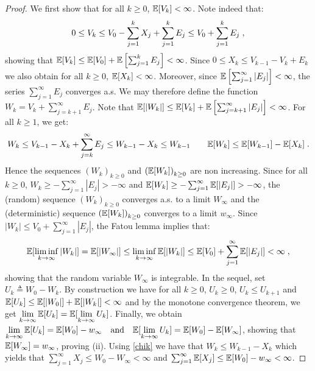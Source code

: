 \documentclass[final,12pt]{alt2022} %
\begin{document}
\begin{proof}
  We first show that for all $k \geq 0$, $\EE[V_k] < \infty$. Note indeed that:
\begin{equation}\notag
0 \leq V_k \leq V_0 - \sum_{j=1}^{k}{X_j} + \sum_{j=1}^{k}{E_j}\leq V_0 + \sum_{j=1}^{k}{E_j} \eqsp,
\end{equation}
showing that $\EE[V_k] \leq \EE[V_0] + \EE\left[\sum_{j=1}^{k}{E_j}\right] < \infty$.
Since $0 \leq X_k \leq V_{k-1} - V_k + E_k$ we also obtain for all $k \geq 0$, $\EE[X_k] < \infty$. Moreover, since $\EE\left[\sum_{j=1}^{\infty}{|E_j|}\right] < \infty$, the series $\sum_{j=1}^{\infty}{E_j}$ converges a.s. We may therefore define the function $W_k = V_k + \sum_{j=k+1}^{\infty}{E_j}$.
Note that $\EE[|W_k|] \leq \EE[V_k]+\EE\left[\sum_{j=k+1}^{\infty}{|E_j|}\right] < \infty $. For all $k \geq 1$, we get:
\begin{equation}\label{chik}
\begin{split}
 W_{k} \leq V_{k-1} - X_{k} + \sum_{j=k}^{\infty}{E_j} \leq W_{k-1} - X_{k}\leq W_{k-1} \qquad \EE[W_k] \leq \EE[W_{k-1}] - \EE[X_{k}] \eqsp.
\end{split}
\end{equation}
Hence the sequences $(W_k)_{k\geq0}$ and $\left(\EE[W_k] \right)_{k\geq0}$ are non increasing. Since for all $k \geq 0$, $W_k \geq -  \sum_{j=1}^{\infty}{|E_j|} > -\infty$ and $\EE[W_k] \geq -  \sum_{j=1}^{\infty}{\EE[|E_j|]} > -\infty$, the (random) sequence $(W_k)_{k\geq0}$ converges a.s. to a limit $W_{\infty}$ and the (deterministic) sequence $\left(\EE[W_k] \right)_{k\geq0}$ converges to a limit $w_{\infty}$. Since $|W_k| \leq V_0 +  \sum_{j=1}^{\infty}{|E_j|}$, the Fatou lemma implies that:
\begin{equation}\notag
\EE[\liminf \limits_{k \to \infty} |W_k|] = \EE[|W_{\infty}|] \leq \liminf \limits_{k \to \infty} \EE[|W_{k}|] \leq \EE[V_{0}] + \sum_{j=1}^{\infty}{\EE[|E_j|]}< \infty \eqsp,
\end{equation}
showing that the random variable $W_{\infty}$  is integrable.
In the sequel, set $U_k \triangleq W_0 - W_k$. By construction we have for all $k \geq 0$, $U_k \geq 0$, $U_k \leq U_{k+1}$ and $\EE[U_k] \leq \EE[|W_0|] + \EE[|W_k|] < \infty$ and by the monotone convergence theorem, we get $\lim \limits_{k \to \infty} \EE[U_k] = \EE[\lim \limits_{k \to \infty}U_k]$.
Finally, we obtain $\lim \limits_{k \to \infty} \EE[U_k] = \EE[W_0] - w_{\infty} \quad \textrm{and} \quad \EE[\lim \limits_{k \to \infty}U_k] = \EE[W_0] - \EE[W_{\infty}]$,
showing that $\EE[W_{\infty}] = w_{\infty}$, proving (ii). Using \eqref{chik} we have that $W_k \leq W_{k-1} - X_k$ which yields that $\sum_{j=1}^{\infty}{X_j} \leq W_{0} - W_{\infty} < \infty$ and $\sum_{j=1}^{\infty}{\EE[X_j]} \leq \EE[W_{0}] - w_{\infty} < \infty$.
\end{proof}
\end{document}
